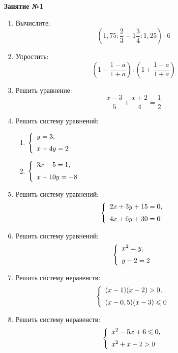 \documentclass[12pt, a4paper]{article}
\begin{document}
	   \cfoot{}
	\begin{center}
		\Large
		\textbf{Занятие №1}
	\end{center}
	\begin{enumerate}[label=\textbf{\arabic*.}]
		\item Вычислите:
		$$\left( 1,75:\dfrac{2}{3}-1\dfrac{3}{4}:1,25 \right)\cdot6$$
		\item Упростить:
		$$\left( 1-\dfrac{1-a}{1+a} \right):\left( 1+\dfrac{1-a}{1+a} \right)$$
		\item Решить уравнение: \[ \dfrac{x-3}{5}+\dfrac{x+2}{4}=\dfrac{1}{2} \]
		\item Решить систему уравнений:
		\begin{multicols}{2}
			\begin{enumerate}[label=\asbuk*)]
			\item 
			$\left\{
			\begin{array}{l}
				y=3,\vspace{0,2cm}\\
				x-4y=2
			\end{array}
			\right.$
			\item 
			$\left\{
			\begin{array}{l}
				3x-5=1,\vspace{0,2cm}\\
				x-10y=-8
			\end{array}
			\right.$
			\end{enumerate}
		\end{multicols}
		\item Решить систему уравнений:
		$$\left\{
		\begin{array}{l}
			2x+3y+15=0,\vspace{0,2cm}\\
			4x+6y+30=0
		\end{array}
		\right.$$
		\item Решить систему уравнений:
		$$\left\{
		\begin{array}{l}
			x^2=y,\vspace{0,2cm}\\
			y-2=2
		\end{array}
		\right.$$
		\item Решить систему неравенств:
		$$\left\{
		\begin{array}{l}
			(x-1)(x-2)>0,\vspace{0,2cm}\\
			(x-0,5)(x-3)\leqslant0
		\end{array}
		\right.$$
		\item Решить систему неравенств:
		$$\left\{
		\begin{array}{l}
			x^2-5x+6\leqslant0,\vspace{0,2cm}\\
			x^2+x-2>0
		\end{array}
		\right.$$
	\end{enumerate}
\end{document}
